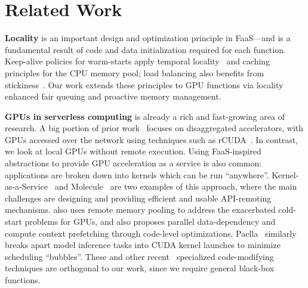 \section{Related Work}
\label{sec:related}

\noindent \textbf{Locality} is an important design and optimization principle in FaaS---and is a fundamental result of code and data initialization required for each function.
Keep-alive policies for warm-starts apply temporal locality~\cite{roy2022icebreaker, ebrahimi2024cold, vahidinia2022mitigating, shahrad2020serverless} and caching~\cite{faascache-asplos21, sundarrajan2017footprint} principles for the CPU memory pool; load balancing also benefits from stickiness~\cite{package-cristina-19, faaslb-hpdc22, abdi2023palette}.
Our work extends these principles to GPU functions via locality enhanced fair queuing and proactive memory management. 


\noindent \textbf{GPUs in serverless computing} is already a rich and fast-growing area of research. 
A big portion of prior work~\cite{naranjo2020accelerated, fingler2022dgsf, kim_gpu_2018} focuses on disaggregated accelerators, with GPUs accessed over the network using techniques such as rCUDA~\cite{duato2010rcuda}.
In contrast, we look at local GPUs without remote execution. 
Using FaaS-inspired abstractions to provide GPU acceleration as a service is also common: applications are broken down into kernels which can be run ``anywhere''.
Kernel-as-a-Service~\cite{pemberton2022kernel} and Molecule~\cite{du2022serverless} are two examples of this approach, where the main challenges are designing and providing efficient and usable API-remoting mechanisms. 
\cite{juan_reducing_2023} also uses remote memory pooling to address the exacerbated cold-start problems for GPUs, and also proposes parallel data-dependency and compute context prefetching through code-level optimizations. 
Paella~\cite{ng2023paella} similarly breaks apart model inference tasks into CUDA kernel launches to minimize scheduling ``bubbles''.
These and other recent~\cite{sage_zhao_towards_2024} specialized code-modifying techniques are orthogonal to our work, since we require general black-box functions.


